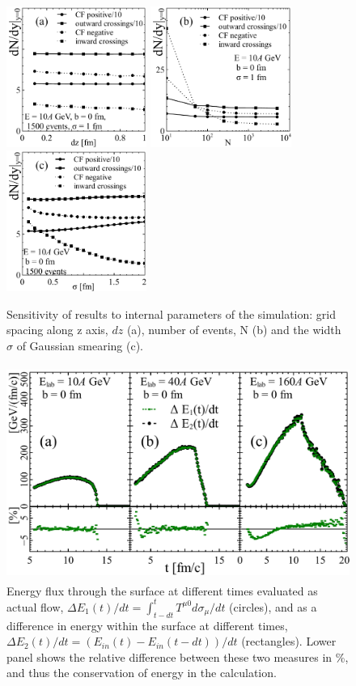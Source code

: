 \begin{figure}[htp]
\includegraphics[height=4.6cm]{plots/cooper_frye/dz.pdf}
\includegraphics[height=4.6cm]{plots/cooper_frye/ev.pdf}
\includegraphics[height=4.6cm]{plots/cooper_frye/sig.pdf}
\caption{Sensitivity of results to internal parameters of the
  simulation: grid spacing along z axis, $dz$ (a), number of
  events, N (b) and the width $\sigma$ of Gaussian
  smearing (c). }
\label{Fig:Int_par}
\end{figure}

\begin{figure}[htp]
\includegraphics[height=7cm]{plots/cooper_frye/Econs.pdf}
\caption{ Energy flux through the surface at different
  times evaluated as actual flow,
  $\Delta E_1(t)/dt = \int_{t-dt}^{t} T^{\mu 0} d\sigma_{\mu}/dt$
  (circles), and as a difference in energy within the surface at
  different times, $\Delta E_2(t)/dt = (E_{in}(t) - E_{in}(t-dt))/dt$
  (rectangles). Lower panel shows the relative difference between
  these two measures in \%, and thus the conservation of energy in the
  calculation.}
\label{Fig:Econs}
\end{figure}


